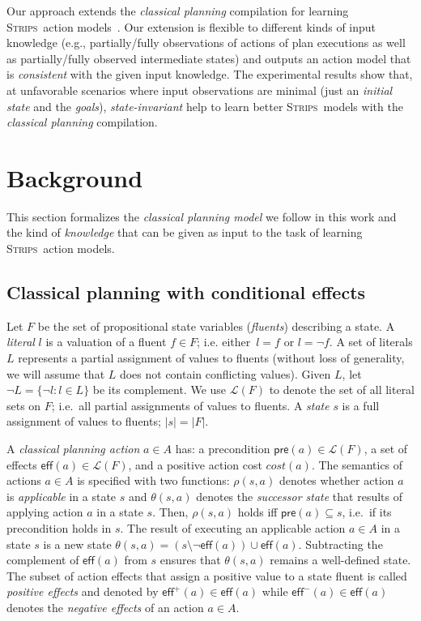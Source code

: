 \documentclass{article}
\newcommand{\pre}{\mathsf{pre}}     %
\newcommand{\eff}{\mathsf{eff}}     %
\newcommand{\strips}{\textsc{Strips}}
\begin{document}
Our approach extends the {\em classical planning} compilation for learning \strips\ action models~\cite{aineto2018learning}. Our extension is flexible to different kinds of input knowledge (e.g., partially/fully observations of actions of plan executions as well as partially/fully observed intermediate states) and outputs an action model that is {\em consistent} with the given input knowledge. The experimental results show that, at unfavorable scenarios where input observations are minimal (just an {\em initial state} and the {\em goals}), {\em state-invariant} help to learn better \strips\ models with the {\em classical planning} compilation. 



\section{Background}
\label{sec:background}
This section formalizes the {\em classical planning model} we follow in this work and the kind of {\em knowledge} that can be given as input to the task of learning \strips\ action models.  

\subsection{Classical planning with conditional effects}
Let $F$ be the set of  propositional state variables ({\em fluents}) describing a state. A {\em literal} $l$ is a valuation of a fluent $f\in F$; i.e. either~$l=f$ or $l=\neg f$. A set of literals $L$ represents a partial assignment of values to fluents (without loss of generality, we will assume that $L$ does not contain conflicting values). Given $L$, let $\neg L=\{\neg l:l\in L\}$ be its complement. We use $\mathcal{L}(F)$ to denote the set of all literal sets on $F$; i.e.~all partial assignments of values to fluents. A {\em state} $s$ is a full assignment of values to fluents; $|s|=|F|$.

A {\em classical planning action} $a\in A$ has: a precondition $\pre(a)\in\mathcal{L}(F)$, a set of effects $\eff(a)\in\mathcal{L}(F)$, and a positive action cost $cost(a)$. The semantics of actions $a\in A$ is specified with two functions: $\rho(s,a)$ denotes whether action $a$ is {\em applicable} in a state $s$ and $\theta(s,a)$ denotes the {\em successor state} that results of applying action $a$ in a state $s$. Then, $\rho(s,a)$ holds iff $\pre(a)\subseteq s$, i.e.~if its precondition holds in $s$. The result of executing an applicable action $a\in A$ in a state $s$ is a new state $\theta(s,a)=(s\setminus \neg\eff(a))\cup\eff(a)$. Subtracting the complement of $\eff(a)$ from $s$ ensures that $\theta(s,a)$ remains a well-defined state. The subset of action effects that assign a positive value to a state fluent is called {\em positive effects} and denoted by $\eff^+(a)\in \eff(a)$ while $\eff^-(a)\in \eff(a)$ denotes the {\em negative effects} of an action $a\in A$.
\end{document}
